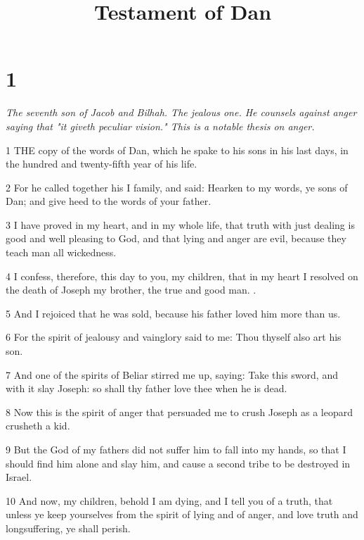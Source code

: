 

\title{Testament of Dan}

\chapter{1}

\par \textit{The seventh son of Jacob and Bilhah. The jealous one. He counsels against anger saying that "it giveth peculiar vision." This is a notable thesis on anger.}

\par 1 THE copy of the words of Dan, which he spake to his sons in his last days, in the hundred and twenty-fifth year of his life.

\par 2 For he called together his I family, and said: Hearken to my words, ye sons of Dan; and give heed to the words of your father.

\par 3 I have proved in my heart, and in my whole life, that truth with just dealing is good and well pleasing to God, and that lying and anger are evil, because they teach man all wickedness.

\par 4 I confess, therefore, this day to you, my children, that in my heart I resolved on the death of Joseph my brother, the true and good man. .

\par 5 And I rejoiced that he was sold, because his father loved him more than us.

\par 6 For the spirit of jealousy and vainglory said to me: Thou thyself also art his son.

\par 7 And one of the spirits of Beliar stirred me up, saying: Take this sword, and with it slay Joseph: so shall thy father love thee when he is dead.

\par 8 Now this is the spirit of anger that persuaded me to crush Joseph as a leopard crusheth a kid.

\par 9 But the God of my fathers did not suffer him to fall into my hands, so that I should find him alone and slay him, and cause a second tribe to be destroyed in Israel.

\par 10 And now, my children, behold I am dying, and I tell you of a truth, that unless ye keep yourselves from the spirit of lying and of anger, and love truth and longsuffering, ye shall perish.

